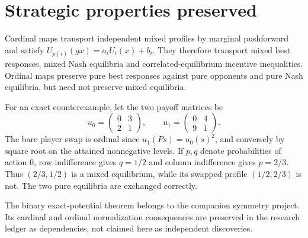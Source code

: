\section{Strategic properties preserved}
Cardinal maps transport independent mixed profiles by marginal pushforward and
satisfy $U_{p(i)}(gx)=a_iU_i(x)+b_i$. They therefore transport mixed best
responses, mixed Nash equilibria and correlated-equilibrium incentive inequalities.
Ordinal maps preserve pure best responses against pure opponents and pure Nash
equilibria, but need not preserve mixed equilibria.

For an exact counterexample, let the two payoff matrices be
\[
u_0=\begin{pmatrix}0&3\\2&1\end{pmatrix},\qquad
u_1=\begin{pmatrix}0&4\\9&1\end{pmatrix}.
\]
The bare player swap is ordinal since $u_1(Ps)=u_0(s)^2$, and conversely by
square root on the attained nonnegative levels. If $p,q$ denote probabilities
of action 0, row indifference gives $q=1/2$ and column indifference gives
$p=2/3$. Thus $(2/3,1/2)$ is a mixed equilibrium, while its swapped profile
$(1/2,2/3)$ is not. The two pure equilibria are exchanged correctly.

The binary exact-potential theorem belongs to the companion symmetry project.
Its cardinal and ordinal normalization consequences are preserved in the
research ledger as dependencies, not claimed here as independent discoveries.
